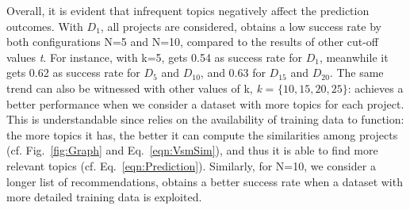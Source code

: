 

Overall, it is evident that infrequent topics negatively affect the prediction outcomes. With $D_{1}$, \ie all projects are considered, \TF obtains a low success rate by both configurations N=5 and N=10, compared to the results of other cut-off values \emph{t}. For instance, with k=5, \TFa gets 0.54 as success rate for $D_{1}$, meanwhile it gets 0.62 as success rate for $D_{5}$ and $D_{10}$, and 0.63 for $D_{15}$ and $D_{20}$. The same trend can also be witnessed with other values of k, \ie \emph{k} = $\{10, 15, 20, 25\}$: \TFa achieves a better performance when we consider a dataset with more topics for each project. This is understandable since \TFa relies on the availability of training data to function: the more topics it has, the better it can compute the similarities among projects (cf. Fig.~\ref{fig:Graph} and Eq.~\ref{eqn:VsmSim}), and thus it is able to find more relevant topics (cf. Eq.~\ref{eqn:Prediction}). Similarly, for N=10, \ie we consider a longer list of recommendations, \TFa obtains a better success rate when a dataset with more detailed training data is exploited. 

